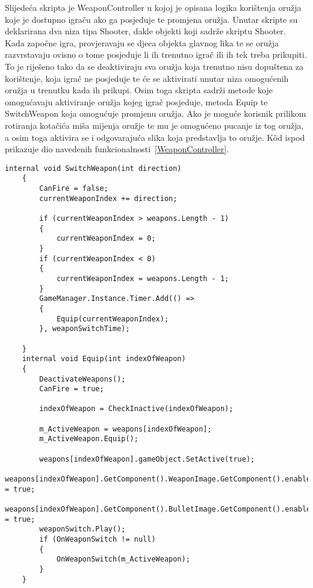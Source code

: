Slijedeća skripta je WeaponController u kojoj je opisana logika korištenja oružja koje je dostupno igraču ako ga posjeduje te promjena oružja. Unutar skripte su deklarirana dva niza tipa Shooter, dakle objekti koji sadrže skriptu Shooter. Kada započne igra, provjeravaju se djeca objekta glavnog lika te se oružja razvrstavaju ovisno o tome posjeduje li ih trenutno igrač ili ih tek treba prikupiti. To je riješeno tako da se deaktiviraju sva oružja koja trenutno nisu dopuštena za korištenje, koja igrač ne posjeduje te će se aktivirati unutar niza omogućenih oružja u trenutku kada ih prikupi. Osim toga skripta sadrži metode koje omogućavaju aktiviranje oružja kojeg igrač posjeduje, metoda Equip te SwitchWeapon koja omogućuje promjenu oružja. Ako je moguće korisnik prilikom rotiranja kotačića miša mijenja oružje te mu je omogućeno pucanje iz tog oružja, a osim toga aktivira se i odgovarajuća slika koja predstavlja to oružje. K\^od ispod prikazuje dio navedenih funkcionalnosti~\ref{WeaponController}.
\begin{lstlisting}[caption={Kontroler oružja}, label=WeaponController]
    internal void SwitchWeapon(int direction)
    {
        CanFire = false;
        currentWeaponIndex += direction;

        if (currentWeaponIndex > weapons.Length - 1)
        {
            currentWeaponIndex = 0;
        }
        if (currentWeaponIndex < 0)
        {
            currentWeaponIndex = weapons.Length - 1;
        }
        GameManager.Instance.Timer.Add(() =>
        {
            Equip(currentWeaponIndex);
        }, weaponSwitchTime);

    }
    internal void Equip(int indexOfWeapon)
    {
        DeactivateWeapons();
        CanFire = true;

        indexOfWeapon = CheckInactive(indexOfWeapon);
        
        m_ActiveWeapon = weapons[indexOfWeapon];
        m_ActiveWeapon.Equip();

        weapons[indexOfWeapon].gameObject.SetActive(true);
        weapons[indexOfWeapon].GetComponent().WeaponImage.GetComponent().enabled = true;
        weapons[indexOfWeapon].GetComponent().BulletImage.GetComponent().enabled = true;
        weaponSwitch.Play();
        if (OnWeaponSwitch != null)
        {
            OnWeaponSwitch(m_ActiveWeapon);
        }
    }
\end{lstlisting}


